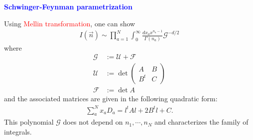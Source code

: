 \documentclass[10pt]{article}
\begin{document}
\textbf{\textcolor{blue}{Schwinger-Feynman parametrization}}

Using  \textcolor{red}{Mellin transformation}, one can show
\begin{align*}
I(\vec{n}) \sim 
\prod_{a=1}^N \int_0^\infty  \frac{dx_a x^{n_a-1}}{\Gamma(n_a)} \mathcal{G}^{-d/2}
\end{align*}
where
\begin{align*}
\mathcal{G} &:= \mathcal{U} + \mathcal{F} \\
\mathcal{U} &:= \det \begin{pmatrix} A & B \\ B^t & C \end{pmatrix} \\
\mathcal{F} &:= \det A 
\end{align*}
and the associated matrices are given in the following quadratic form:
\begin{align*}
\sum_a^N x_a D_a = l^t A l +  2B^t l + C.
\end{align*}
This polynomial $\mathcal{G}$ does not depend on $n_1, \cdots, n_N$ and characterizes the family of integrals.
\end{document}
